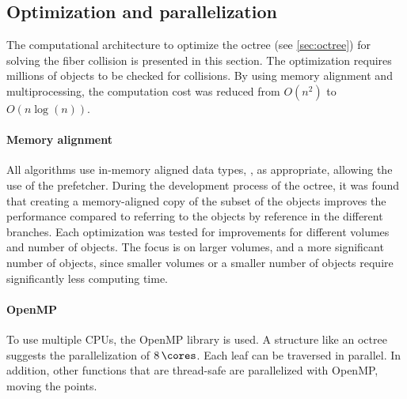 \subsection{Optimization and parallelization}\label{sec:modelOpt}
% 
The computational architecture to optimize the octree (see \cref{sec:octree}) for solving the fiber collision is presented in this section.
The optimization requires millions of objects to be checked for collisions.
By using memory alignment and multiprocessing, the computation cost was reduced from $O(n^2)$ to $O(n\log(n))$.
% 
%
\paragraph{Memory alignment}
All algorithms use in-memory aligned data types, \eg{} , as appropriate, allowing the use of the  prefetcher.
During the development process of the octree, it was found that creating a memory-aligned copy of the subset of the objects improves the performance compared to referring to the objects by reference in the different branches.
Each optimization was tested for improvements for different volumes and number of objects.
The focus is on larger volumes, and a more significant number of objects, since smaller volumes or a smaller number of objects require significantly less computing time.
%
%
\paragraph{OpenMP}
To use multiple \acp{CPU}, the \ac{OpenMP} library is used.
A structure like an octree suggests the parallelization of $\SI{8}{\cores}$.
Each leaf can be traversed in parallel.
In addition, other functions that are thread-safe are parallelized with \ac{OpenMP}, \eg{} moving the points.
%
%
%
